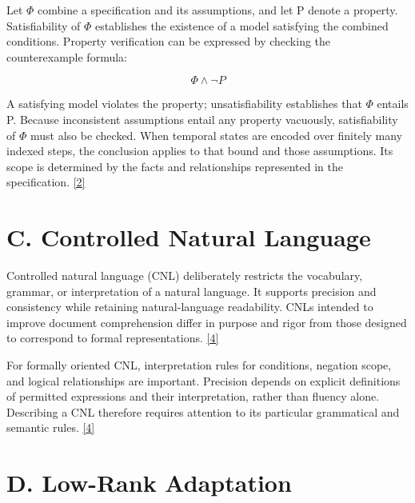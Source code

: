 \documentclass[11pt,a4paper]{article}
\begin{document}
Let \ensuremath{\Phi} combine a specification and its assumptions, and let P denote a property. Satisfiability of \ensuremath{\Phi} establishes the existence of a model satisfying the combined conditions. Property verification can be expressed by checking the counterexample formula:\par

\[\Phi \land \neg P\]

A satisfying model violates the property; unsatisfiability establishes that \ensuremath{\Phi} entails P. Because inconsistent assumptions entail any property vacuously, satisfiability of \ensuremath{\Phi} must also be checked. When temporal states are encoded over finitely many indexed steps, the conclusion applies to that bound and those assumptions. Its scope is determined by the facts and relationships represented in the specification. \href{\detokenize{https://theory.stanford.edu/~barrett/pubs/BT18.pdf}}{[2]}\par

\section*{C. Controlled Natural Language}

Controlled natural language (CNL) deliberately restricts the vocabulary, grammar, or interpretation of a natural language. It supports precision and consistency while retaining natural-language readability. CNLs intended to improve document comprehension differ in purpose and rigor from those designed to correspond to formal representations. \href{\detokenize{https://aclanthology.org/J14-1005/}}{[4]}\par

For formally oriented CNL, interpretation rules for conditions, negation scope, and logical relationships are important. Precision depends on explicit definitions of permitted expressions and their interpretation, rather than fluency alone. Describing a CNL therefore requires attention to its particular grammatical and semantic rules. \href{\detokenize{https://aclanthology.org/J14-1005/}}{[4]}\par

\section*{D. Low-Rank Adaptation}
\end{document}
